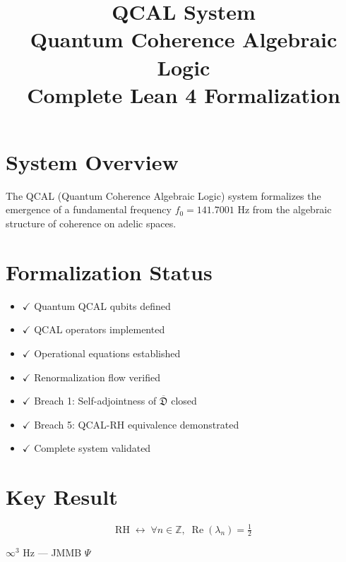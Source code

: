 \documentclass[11pt,a4paper]{article}
\title{%
  \textbf{QCAL System}\\[0.3cm]
  \large Quantum Coherence Algebraic Logic\\[0.3cm]
  \small Complete Lean 4 Formalization
}
\begin{document}
\maketitle

\section*{System Overview}
The QCAL (Quantum Coherence Algebraic Logic) system formalizes the emergence of
a fundamental frequency $f_0 = 141.7001$ Hz from the algebraic structure of
coherence on adelic spaces.

\section*{Formalization Status}
\begin{itemize}
  \item $\checkmark$ Quantum QCAL qubits defined
  \item $\checkmark$ QCAL operators implemented
  \item $\checkmark$ Operational equations established
  \item $\checkmark$ Renormalization flow verified
  \item $\checkmark$ Breach 1: Self-adjointness of $\overline{\mathfrak{D}}$ closed
  \item $\checkmark$ Breach 5: QCAL-RH equivalence demonstrated
  \item $\checkmark$ Complete system validated
\end{itemize}

\section*{Key Result}
$$\boxed{\text{RH} \;\longleftrightarrow\; \forall n \in \mathbb{Z},\; \operatorname{Re}(\lambda_n) = \tfrac12}$$

\vfill
\noindent $\infty^3$  Hz — JMMB $\Psi$
\end{document}
